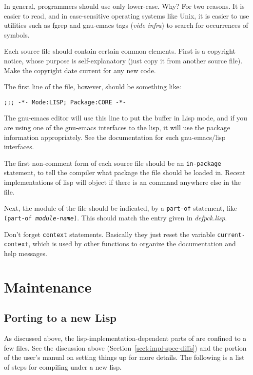 In general, programmers should use only lower-case.  Why? For two
reasons.  It is easier to read, and in case-sensitive operating
systems like Unix, it is easier to use utilities such as fgrep and
gnu-emacs tags ({\it vide infra}) to search for occurrences of symbols.

Each \TPS source file should contain certain common elements. First is
a copyright notice, whose purpose is self-explanatory (just copy it
from another source file).  Make the copyright date current for any
new code.

The first line of the file, however, should be something like:
\begin{verbatim}
;;; -*- Mode:LISP; Package:CORE -*-
\end{verbatim}
The gnu-emacs editor will use this line to put the buffer in Lisp
mode, and if you are using one of the gnu-emacs interfaces to the
lisp, it will use the package information appropriately.  See the
documentation for such gnu-emacs/lisp interfaces.

The first non-comment form of each source file should be an
{\tt in-package} statement, to tell the compiler what package the file
should be loaded in. Recent implementations of lisp will object if
there is an {\tt {}} command anywhere else in the file.

Next, the \TPS module of the file should be indicated, by a
{\tt part-of} statement, like {\tt (part-of {\it module-name})}.
This should match the entry given in {\it defpck.lisp}.

Don't forget {\tt context} statements.  Basically they just
reset the variable {\tt current-context}, which is used by other
functions to organize the documentation and help messages.

\section{Maintenance}

\subsection{Porting \TPS to a new Lisp}
As discussed above, the lisp-implementation-dependent parts of \TPS are confined to
a few files.  See the discussion above (Section~\ref{sect:impl-spec-diffs})
and the portion of the user's manual on setting things up for more details.
The following is a list of steps for compiling \TPS under a new lisp.

